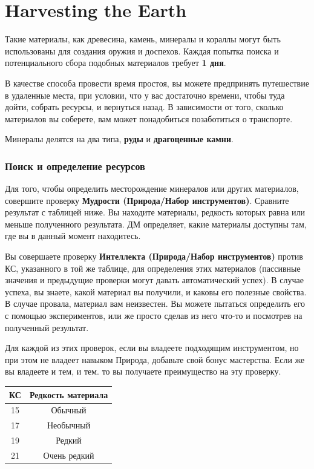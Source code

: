 \documentclass[a4paper, 9pt, twocolumn]{book}
\begin{document}
	
	
	\section{Harvesting the Earth}
	
	Такие материалы, как древесина, камень, минералы и кораллы могут быть использованы для создания оружия и доспехов. Каждая попытка поиска и потенциального сбора подобных материалов требует \textbf{1 дня}.
	
	В качестве способа провести время простоя, вы можете предпринять путешествие в удаленные места, при условии, что у вас достаточно времени, чтобы туда дойти, собрать ресурсы, и вернуться назад. В зависимости от того, сколько материалов вы соберете, вам может понадобиться позаботиться о транспорте.
	
	Минералы делятся на два типа, \textbf{руды} и \textbf{драгоценные камни}.
	
	\subsubsection{Поиск и определение ресурсов}
	
	Для того, чтобы определить месторождение минералов или других материалов, совершите проверку \textbf{Мудрости (Природа/Набор инструментов)}. Сравните результат с таблицей ниже. Вы находите материалы, редкость которых равна или меньше полученного результата. ДМ определяет, какие материалы доступны там, где вы в данный момент находитесь.
	
	Вы совершаете проверку \textbf{Интеллекта (Природа/Набор инструментов)} против КС, указанного в той же таблице, для определения этих материалов (пассивные значения и предыдущие проверки могут давать автоматический успех). В случае успеха, вы знаете, какой материал вы получили, и каковы его полезные свойства. В случае провала, материал вам неизвестен. Вы можете пытаться определить его с помощью экспериментов, или же просто сделав из него что-то и посмотрев на полученный результат.
	
	Для каждой из этих проверок, если вы владеете подходящим инструментом, но при этом не владеет навыком Природа, добавьте свой бонус мастерства. Если же вы владеете и тем, и тем. то вы получаете преимущество на эту проверку.
	
	\begin{tabular}{|c|c|}
		\hline
		\textbf{КС} & \textbf{Редкость материала} \\
		\hline
		15 & Обычный \\
		\hline
		17 & Необычный \\
		\hline
		19 & Редкий \\
		\hline
		21 & Очень редкий \\
		\hline
	\end{tabular}
	
\end{document}
